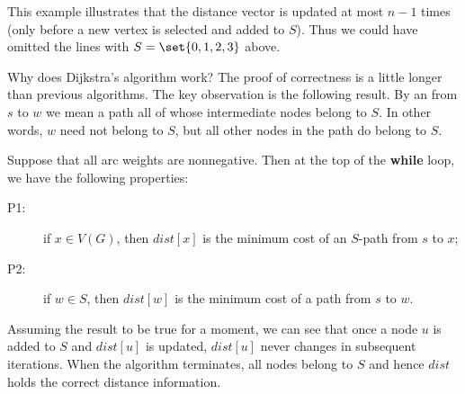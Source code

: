 This example illustrates that the distance vector is updated at most $n
- 1$ times (only before a new vertex is selected and added to $S$). 
Thus we could have omitted the lines with $S=\set{0,1,2,3}$ above.

Why does Dijkstra's algorithm work? The proof of correctness is a little
longer than previous algorithms. The key observation is the following result. By an  from $s$ to $w$ we mean a path all of whose intermediate nodes belong to $S$. In other words, $w$ need not belong to $S$, but all other nodes in the path do belong to $S$.

\begin{Theorem}
\label{thm:dijkstra} Suppose that all arc weights are nonnegative. Then
at the top of the \textbf{while} loop, we have the following properties:
\begin{description}
\item[P1:] if $x\in V(G)$, then $dist[x]$ is the minimum cost of an $S$-path from $s$ to $x$;
\item[P2:] if $w\in S$, then $dist[w]$ is the minimum cost of a path
from $s$ to $w$.
\end{description}
\end{Theorem}

\begin{note} Assuming the result to be true for a moment, we can see
that once a node $u$ is added to $S$ and $dist[u]$ is updated, $dist[u]$
never changes in subsequent iterations. When the algorithm terminates,
all nodes belong to $S$ and hence $dist$ holds the correct distance information.
\end{note}

